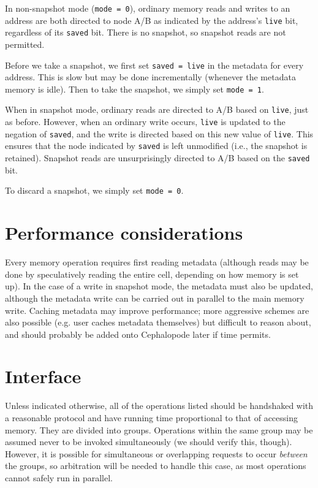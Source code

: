 \documentclass[a4paper]{article}
\newcommand{\code}[1]{\texttt{#1}}
\begin{document}
In non-snapshot mode (\code{mode = 0}), ordinary memory reads and writes to an address are both directed to node A/B as indicated by the address's \code{live} bit, regardless of its \code{saved} bit.
%
There is no snapshot, so snapshot reads are not permitted.

Before we take a snapshot, we first set \code{saved = live} in the metadata for every address. %
%
This is slow but may be done incrementally (whenever the metadata memory is idle).
%
Then to take the snapshot, we simply set \code{mode = 1}.

When in snapshot mode, ordinary reads are directed to A/B based on \code{live}, just as before.
%
However, when an ordinary write occurs, \code{live} is updated to the negation of \code{saved}, and the write is directed based on this new value of \code{live}.
%
This ensures that the node indicated by \code{saved} is left unmodified (i.e., the snapshot is retained).
%
Snapshot reads are unsurprisingly directed to A/B based on the \code{saved} bit.

To discard a snapshot, we simply set \code{mode = 0}.

\section{Performance considerations}

Every memory operation requires first reading metadata (although reads may be done by speculatively reading the entire cell, depending on how memory is set up).
%
In the case of a write in snapshot mode, the metadata must also be updated, although the metadata write can be carried out in parallel to the main memory write.
%
Caching metadata may improve performance; more aggressive schemes are also possible (e.g. user caches metadata themselves) but difficult to reason about, and should probably be added onto Cephalopode later if time permits.

\section{Interface}

Unless indicated otherwise, all of the operations listed should be handshaked with a reasonable protocol and have running time proportional to that of accessing memory.
%
They are divided into groups.
%
Operations within the same group may be assumed never to be invoked simultaneously (we should verify this, though).
%
However, it is possible for simultaneous or overlapping requests to occur \emph{between} the groups, so arbitration will be needed to handle this case, as most operations cannot safely run in parallel.
\end{document}
